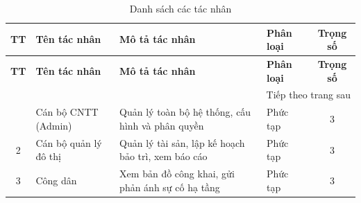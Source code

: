 \begin{longtable}{|c|p{3cm}|p{6cm}|p{2cm}|c|}
\caption{Danh sách các tác nhân \label{tab:danh_sach_tac_nhan}} \\
\hline
\textbf{TT} & \textbf{Tên tác nhân} & \textbf{Mô tả tác nhân} & \textbf{Phân loại} & \textbf{Trọng số} \\ \hline
\endfirsthead
\hline
\textbf{TT} & \textbf{Tên tác nhân} & \textbf{Mô tả tác nhân} & \textbf{Phân loại} & \textbf{Trọng số} \\ \hline
\endhead
\hline
\multicolumn{5}{r}{{Tiếp theo trang sau}} \\
\endfoot
\hline
\endlastfoot
1 & Cán bộ CNTT (Admin) & Quản lý toàn bộ hệ thống, cấu hình và phân quyền & Phức tạp & 3 \\ \hline
2 & Cán bộ quản lý đô thị & Quản lý tài sản, lập kế hoạch bảo trì, xem báo cáo & Phức tạp & 3 \\ \hline
3 & Công dân & Xem bản đồ công khai, gửi phản ánh sự cố hạ tầng & Phức tạp & 3 \\ \hline
\end{longtable}